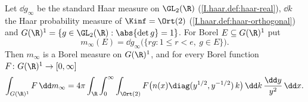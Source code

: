 Let $\dd g_\infty$ be the standard Haar measure on $\GL_2(\R)$ (\cref{I.haar.def:haar-real}), $\dd k$ the Haar probability
measure of $\Kinf=\Ort(2)$ (\cref{I.haar.def:haar-orthogonal}) and $G(\R)^1=\{g\in\GL_2(\R):\abs{\det g}=1\}$. For Borel
$E\subseteq G(\R)^1$ put
\[
  m_\infty(E)=\dd g_\infty\bigl(\{rg:1\le r<e,\ g\in E\}\bigr).
\]
Then $m_\infty$ is a Borel measure on $G(\R)^1$, and for every Borel function $F\colon G(\R)^1\to[0,\infty]$
\[
  \int_{G(\R)^1}F\,\dd m_\infty=4\pi\int_\R\int_0^\infty\int_{\Ort(2)}F\bigl(n(x)\diag(y^{1/2},y^{-1/2})\,k\bigr)\,\dd k\,\frac{\dd y}{y^2}\,\dd x .
\]
